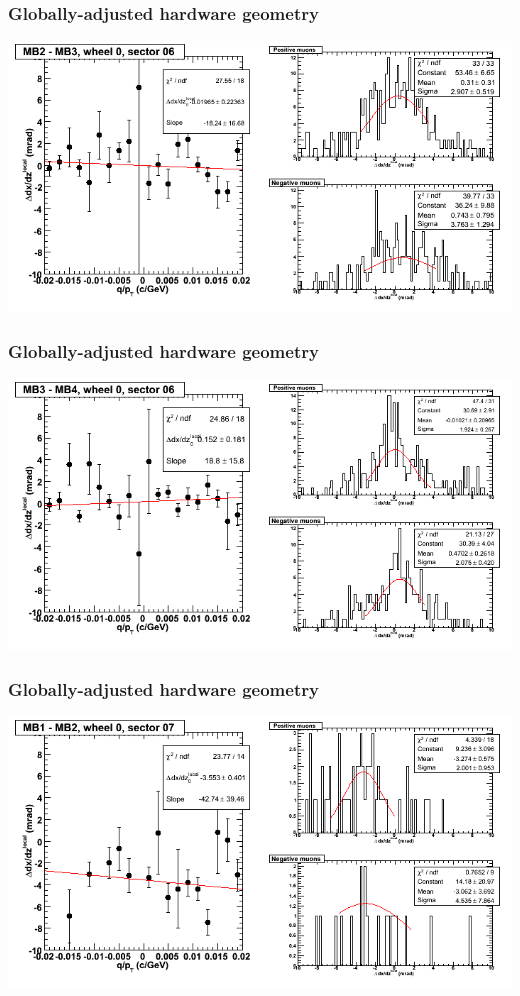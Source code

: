 \documentclass[compress]{beamer}
\begin{document}
\begin{frame}
\frametitle{Globally-adjusted hardware geometry}
\includegraphics[width=\linewidth]{NOV4_segdiffs_HW/dt13_slope_C_06_23.png}
\end{frame}

\begin{frame}
\frametitle{Globally-adjusted hardware geometry}
\includegraphics[width=\linewidth]{NOV4_segdiffs_HW/dt13_slope_C_06_34.png}
\end{frame}

\begin{frame}
\frametitle{Globally-adjusted hardware geometry}
\includegraphics[width=\linewidth]{NOV4_segdiffs_HW/dt13_slope_C_07_12.png}
\end{frame}
\end{document}
